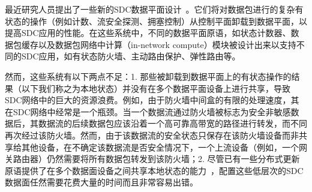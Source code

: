 \documentclass{ctexart}
\begin{document}
最近研究人员提出了一些新的SDC数据平面设计~\cite{bianchi2014openstate, opensdc}。它们将对数据包进行的复杂有状态的操作（例如计数、流安全探测、拥塞控制）从控制平面卸载到数据平面，以提高SDC应用的性能。在这些系统中，不同的数据平面原语，如状态计数器、数据包缓存以及数据包网络中计算（in-network compute）模块被设计出来以支持不同的SDC应用，如有状态防火墙、主动路由保护、弹性路由等。


然而，这些系统有以下两点不足：1. 那些被卸载到数据平面上的有状态操作的结果（以下我们称之为本地状态）并没有在多个数据平面设备上进行共享，导致SDC网络中的巨大的资源浪费。例如，由于防火墙中间盒的有限的处理速度，其在SDC网络中经常是一个瓶颈。当一个数据流通过防火墙被标志为安全非敏感数据后，其数据流的后续数据包应该沿着一个高可靠高带宽的路径进行转发，而不同再次经过该防火墙。然而，由于该数据流的安全状态只保存在该防火墙设备而非共享给其他设备，在不确定该数据流是否安全情况下，一个上流设备（例如，一个网关路由器）仍然需要将所有数据包转发到该防火墙；2. 尽管已有一些分布式更新原语提供了在多个数据面设备之间共享本地状态的能力~\cite{ddp}，配置这些低层次的SDC数据面任然需要花费大量的时间而且非常容易出错。

\end{document}

